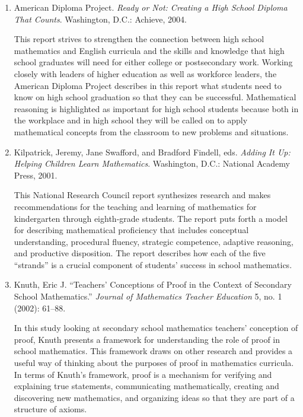 \documentclass[
  10pt,
  a4paper,
  landscape,
  twoside,
  openany
]{scrbook}
\newcommand{\EN}[1]{#1}
\begin{document}
\TriPara
{
\EN{
  \begin{enumerate}
    \item American Diploma Project. \emph{Ready or Not: Creating a High School Diploma That Counts}. Washington, D.C.: Achieve, 2004.
    
      This report strives to strengthen the connection between high school mathematics and English curricula and the skills and knowledge that high school graduates will need for either college or postsecondary work. Working closely with leaders of higher education as well as workforce leaders, the American Diploma Project describes in this report what students need to know on high school graduation so that they can be successful. Mathematical reasoning is highlighted as important for high school students because both in the workplace and in high school they will be called on to apply mathematical concepts from the classroom to new problems and situations.

    \item Kilpatrick, Jeremy, Jane Swafford, and Bradford Findell, eds. \emph{Adding It Up: Helping Children Learn Mathematics}. Washington, D.C.: National Academy Press, 2001.
    
      This National Research Council report synthesizes research and makes recommendations for the teaching and learning of mathematics for kindergarten through eighth-grade students. The report puts forth a model for describing mathematical proficiency that includes conceptual understanding, procedural fluency, strategic competence, adaptive reasoning, and productive disposition. The report describes how each of the five ``strands'' is a crucial component of students' success in school mathematics.

    \item Knuth, Eric J. ``Teachers' Conceptions of Proof in the Context of Secondary School Mathematics.'' \emph{Journal of Mathematics Teacher Education} 5, no. 1 (2002): 61--88.
    
      In this study looking at secondary school mathematics teachers' conception of proof, Knuth presents a framework for understanding the role of proof in school mathematics. This framework draws on other research and provides a useful way of thinking about the purposes of proof in mathematics curricula. In terms of Knuth's framework, proof is a mechanism for verifying and explaining true statements, communicating mathematically, creating and discovering new mathematics, and organizing ideas so that they are part of a structure of axioms.


\end{enumerate}}}
\end{document}
